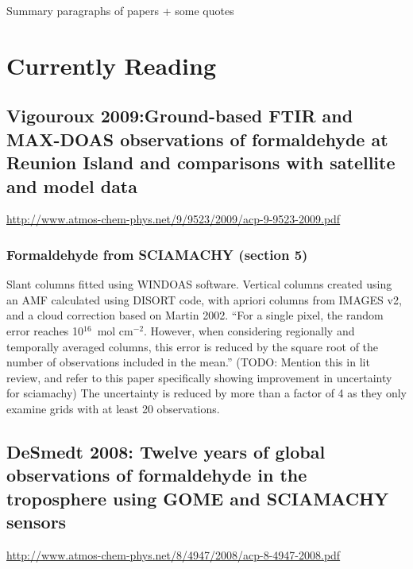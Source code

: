\documentclass[11pt]{article} %
\begin{document}

\begin{titlepage}
\begin{center}
Summary paragraphs of papers + some quotes

\end{center}
\end{titlepage}

\tableofcontents %
\listoffigures %
\listoftables %


\section{Currently Reading}
  \subsection{Vigouroux 2009:Ground-based FTIR and MAX-DOAS observations of formaldehyde at Reunion Island and comparisons with satellite and model data}
  \url{http://www.atmos-chem-phys.net/9/9523/2009/acp-9-9523-2009.pdf}
  \citet{Vigouroux2009}
    \subsubsection{Formaldehyde from SCIAMACHY (section 5)}
      Slant columns fitted using WINDOAS software.
      Vertical columns created using an AMF calculated using DISORT code, with apriori columns from IMAGES v2, and a cloud correction based on Martin 2002.
      ``For  a  single  pixel,  the  random  error  reaches  10$^{16}$~mol cm$^{-2}$.
      However, when considering regionally and temporally averaged columns, this error is reduced by the square root of the number of observations included in the mean.''
      (TODO: Mention this in lit review, and refer to this paper specifically showing improvement in uncertainty for sciamachy)
      The uncertainty is reduced by more than a factor of 4 as they only examine grids with at least 20 observations.
      
  \subsection{DeSmedt 2008: Twelve years of global observations of formaldehyde in the troposphere using GOME and SCIAMACHY sensors}
  \url{http://www.atmos-chem-phys.net/8/4947/2008/acp-8-4947-2008.pdf}
  \citet{DeSmedt2008}
\end{document}
